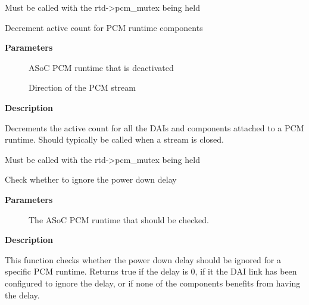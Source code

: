 \documentclass[a4paper,8pt,english]{sphinxmanual}
\begin{document}
Must be called with the rtd-\textgreater{}pcm\_mutex being held

\begin{fulllineitems}
\label{sound/kernel-api/alsa-driver-api:c.snd_soc_runtime_deactivate}
Decrement active count for PCM runtime components

\end{fulllineitems}


\textbf{Parameters}
\begin{description}
\item[{}] \leavevmode
ASoC PCM runtime that is deactivated

\item[{}] \leavevmode
Direction of the PCM stream

\end{description}

\textbf{Description}

Decrements the active count for all the DAIs and components attached to a PCM
runtime. Should typically be called when a stream is closed.

Must be called with the rtd-\textgreater{}pcm\_mutex being held

\begin{fulllineitems}
\label{sound/kernel-api/alsa-driver-api:c.snd_soc_runtime_ignore_pmdown_time}
Check whether to ignore the power down delay

\end{fulllineitems}


\textbf{Parameters}
\begin{description}
\item[{}] \leavevmode
The ASoC PCM runtime that should be checked.

\end{description}

\textbf{Description}

This function checks whether the power down delay should be ignored for a
specific PCM runtime. Returns true if the delay is 0, if it the DAI link has
been configured to ignore the delay, or if none of the components benefits
from having the delay.
\end{document}
